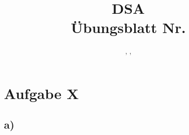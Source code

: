 \documentclass[12pt]{scrartcl}
\title{DSA \\ \large Übungsblatt Nr. \workSheetNr}
\author{\memberA, \memberB, \memberC}
\date{\dateOfFinishing }
\begin{document}
	\maketitle
	\newpage


	\section*{Aufgabe X}
	\subsection*{a)}








\end{document}

